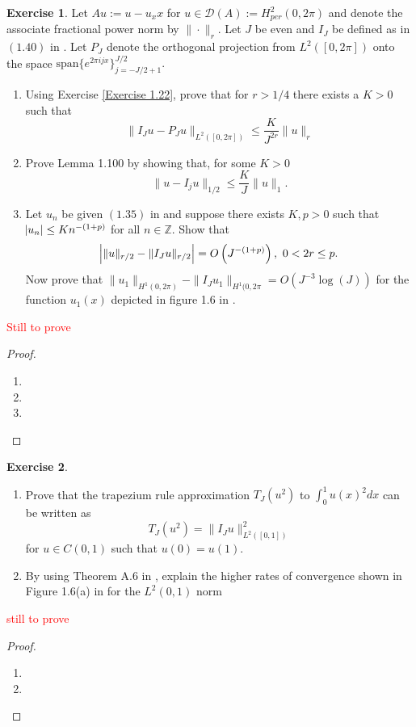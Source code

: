 \documentclass{amsart}
\theoremstyle{plain}
\theoremstyle{definition}
\newtheorem{exer}{Exercise}[section]
\newcommand{\Z}{\mathbb{Z}}
\newcommand{\tcr}[1]{\textcolor{red}{#1}}
\begin{document}
\begin{exer}
    Let $Au := u-u_xx$ for $u\in \mathcal{D}(A):=H^2_{per}(0,2\pi)$ and denote the associate fractional power norm by $\|\cdot\|_{r}.$ Let $J$ be even and $I_J$ be defined as in $(1.40)$ in \cite{lord2014introduction}.  Let $P_{J}$ denote the orthogonal projection from $L^2([0,2\pi])$ onto the space $\text{span}\{e^{2\pi i j x}\}_{j=-J/2+1}^{J/2}.$
    \begin{enumerate}[label=\alph*.]
        \item Using Exercise \ref{Exercise 1.22}, prove that for $r>1/4$ there exists a $K>0$ such that
        $$\|I_{J}u - P_{J}u\|_{L^2([0,2\pi])} \leq \frac{K}{J^{2r}}\|u\|_{r}$$
        \item Prove Lemma 1.100 by showing that, for some $K > 0$
        $$\|u-I_{j}u\|_{1/2} \leq \frac{K}{J} \|u\|_{1}.$$
        \item Let $u_n$ be given $(1.35)$ in \cite{lord2014introduction} and suppose there exists $K,p > 0$ such that $\abs{u_n} \leq Kn^{-(1+p)}$ for all $n\in\Z.$ Show that 
        $$\abs{\|u\|_{r/2}-\|I_{J}u\|_{r/2}} = O\left(J^{-(1+p)}\right), \ 0 < 2r \leq p.$$
        Now prove that $\|u_1\|_{H^1(0,2\pi)}-\|I_J u_1\|_{H^1(0,2\pi} = O\left(J^{-3}\log(J)\right)$ for the function $u_1(x)$ depicted in figure 1.6 in \cite{lord2014introduction}. 
    \end{enumerate}
\end{exer}
\tcr{Still to prove}
\begin{proof}
     \begin{enumerate}[label=\alph*.]
        \item 
        \item 
        \item
    \end{enumerate}
\end{proof}

\begin{exer}
    \begin{enumerate}[label=\alph*.]
        \item Prove that the trapezium rule approximation $T_J \left(u^2\right)$ to $\int_0^1 u(x)^2 dx $  can be written as 
        $$T_J(u^2) = \|I_{J}u\|_{L^2\left([0,1]\right)}^2$$ for $u\in C(0,1)$ such that $u(0)=u(1)$.
        \item By using Theorem A.6 in \cite{lord2014introduction}, explain the higher rates of convergence shown in Figure 1.6(a) in \cite{lord2014introduction} for the $L^2(0,1)$ norm
    \end{enumerate}
    
\end{exer}
\tcr{still to prove}
\begin{proof}
    \begin{enumerate}[label=\alph*.]
        \item 
        \item
    \end{enumerate}  
\end{proof}
\end{document}
